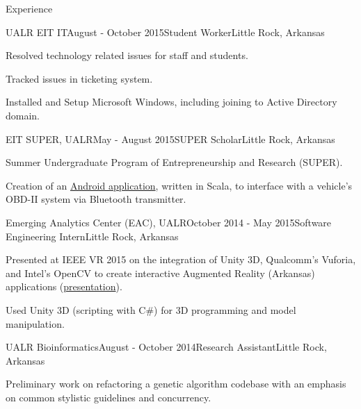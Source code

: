 \documentclass{resume} %
\begin{document}
\begin{rSection}{Experience}
\begin{rSubsection}{UALR EIT IT}{August - October 2015}{Student Worker}{Little Rock, Arkansas}

	\item Resolved technology related issues for staff and students.
	\item Tracked issues in ticketing system.
	\item Installed and Setup Microsoft Windows, including joining to Active Directory domain.
\end{rSubsection}

\begin{rSubsection}{EIT SUPER, UALR}{May - August 2015}{SUPER Scholar}{Little Rock, Arkansas}

	\item Summer Undergraduate Program of Entrepreneurship and Research (SUPER).
	\item Creation of an \href{http://github.com/cptaffe/flamethrower}{Android application}, written in Scala, to interface with a vehicle's OBD-II system via Bluetooth transmitter.
\end{rSubsection}

\begin{rSubsection}{Emerging Analytics Center (EAC), UALR}{October 2014 - May 2015}{Software Engineering Intern}{Little Rock, Arkansas}
	\item Presented at IEEE VR 2015 on the integration of Unity 3D, Qualcomm's Vuforia, and Intel's OpenCV to create interactive Augmented Reality (Arkansas) applications (\href{http://byteflame.org/ieee_vr/}{presentation}{}).
	\item Used Unity 3D (scripting with C\#) for 3D programming and model manipulation.
\end{rSubsection}

\begin{rSubsection}{UALR Bioinformatics}{August - October 2014}{Research Assistant}{Little Rock, Arkansas}

	\item Preliminary work on refactoring a genetic algorithm codebase with an emphasis on common stylistic guidelines and concurrency.
\end{rSubsection}

\end{rSection}

\clearpage


\end{document}
